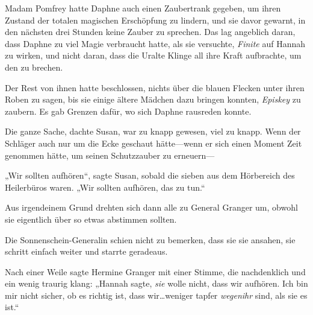 Madam Pomfrey hatte Daphne auch einen Zaubertrank gegeben, um ihren Zustand der totalen magischen Erschöpfung zu lindern, und sie davor gewarnt, in den nächsten drei Stunden keine Zauber zu sprechen. Das lag angeblich daran, dass Daphne zu viel Magie verbraucht hatte, als sie versuchte, \emph{Finite} auf Hannah zu wirken, und nicht daran, dass die Uralte Klinge all ihre Kraft aufbrachte, um den  zu brechen.

Der Rest von ihnen hatte beschlossen, nichts über die blauen Flecken unter ihren Roben zu sagen, bis sie einige ältere Mädchen dazu bringen konnten, \emph{Episkey} zu zaubern. Es gab Grenzen dafür, wo sich Daphne rausreden konnte.

Die ganze Sache, dachte Susan, war zu knapp gewesen, viel zu knapp. Wenn der Schläger auch nur um die Ecke geschaut hätte—wenn er sich einen Moment Zeit genommen hätte, um seinen Schutzzauber zu erneuern—

„Wir sollten aufhören“, sagte Susan, sobald die sieben aus dem Hörbereich des Heilerbüros waren. „Wir sollten aufhören, das zu tun.“

Aus irgendeinem Grund drehten sich dann alle zu General Granger um, obwohl sie eigentlich über so etwas abstimmen sollten.

Die Sonnenschein-Generalin schien nicht zu bemerken, dass sie sie ansahen, sie schritt einfach weiter und starrte geradeaus.

Nach einer Weile sagte Hermine Granger mit einer Stimme, die nachdenklich und ein wenig traurig klang: „Hannah sagte, \emph{sie} wolle nicht, dass wir aufhören. Ich bin mir nicht sicher, ob es richtig ist, dass wir…weniger tapfer \emph{wegenihr} sind, als sie es ist.“

